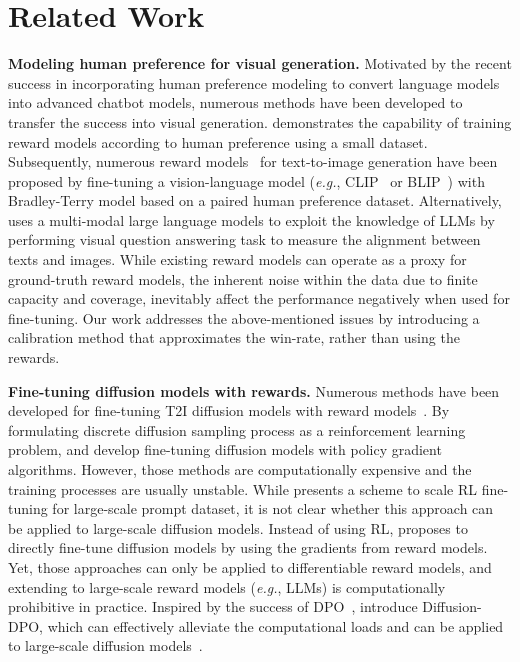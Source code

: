 
\section{Related Work}
\label{sec:relatedworks}
\noindent
{\bf Modeling human preference for visual generation.}
Motivated by the recent success in incorporating human preference modeling to convert language models into advanced chatbot models, numerous methods have been developed to transfer the success into visual generation.
\citet{lee2023aligning} demonstrates the capability of training reward models according to human preference using a small dataset. 
Subsequently, numerous reward models~\citep{kirstain2023pick, xu2023imagereward, wu2023human, wu2023human2, zhang2024learning} for text-to-image generation have been proposed by fine-tuning a vision-language model (\emph{e.g.}, CLIP~\citep{radford2021learning} or BLIP~\citep{li2022blip}) with Bradley-Terry model
based on a paired human preference dataset.
Alternatively, \citet{lin2025evaluating} uses a multi-modal large language models to exploit the knowledge of LLMs by performing visual question answering task to measure the alignment between texts and images.
While existing reward models can operate as a proxy for ground-truth reward models, the inherent noise within the data due to finite capacity and coverage, 
inevitably affect the performance negatively when used for fine-tuning. 
%
Our work addresses the above-mentioned issues by introducing a calibration method that approximates the win-rate, rather than using the rewards. 

\noindent
{\bf Fine-tuning diffusion models with rewards.}
Numerous methods have been developed for fine-tuning T2I diffusion models with reward models~\citep{lee2023aligning, black2023training, fan2023dpok, deng2024prdp, clark2023directly, lee2025parrot, wallace2023diffusion}.
By formulating discrete diffusion sampling process as a reinforcement learning problem, \citet{black2023training} and \citet{fan2023dpok} develop fine-tuning diffusion models with policy gradient algorithms. 
However, those methods are computationally expensive and the training processes are usually unstable.  
While \citet{deng2024prdp} presents a scheme to scale RL fine-tuning for large-scale prompt dataset, it is not clear whether this approach can be applied to large-scale diffusion models. 
Instead of using RL, \citep{clark2023directly} proposes to directly fine-tune diffusion models by using the gradients from reward models. Yet, those approaches can only be applied to differentiable reward models, and extending to large-scale reward models (\emph{e.g.}, LLMs) is computationally prohibitive in practice.
Inspired by the success of DPO~\citep{rafailov2024direct}, \citet{wallace2023diffusion} introduce Diffusion-DPO, which can effectively alleviate the computational loads and can be applied to large-scale diffusion models~\citep{esser2024scaling}. 